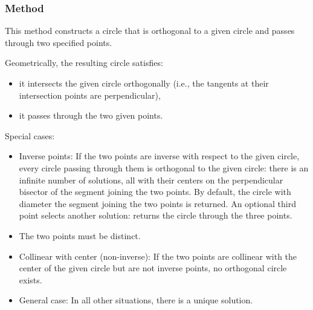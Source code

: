 \subsubsection{Method }
\label{ssub:method_circle_orthogonal_through}

This method constructs a circle that is orthogonal to a given circle and passes through two specified points.

\medskip

Geometrically, the resulting circle satisfies:
\begin{itemize}
\item it intersects the given circle orthogonally (i.e., the tangents at their intersection points are perpendicular),
\item it passes through the two given points.
\end{itemize}

\medskip

Special cases:
\begin{itemize}
\item Inverse points:
If the two points are inverse with respect to the given circle, every circle passing through them is orthogonal to the given circle: there is an infinite number of solutions, all with their centers on the perpendicular bisector of the segment joining the two points.
By default, the circle with diameter the segment joining the two points is returned. An optional third point selects another solution:  returns the circle through the three points.

\item The two points must be distinct.

\item Collinear with center (non-inverse):
If the two points are collinear with the center of the given circle but are not inverse points, no orthogonal circle exists.

\item General case:
In all other situations, there is a unique solution.
\end{itemize}

